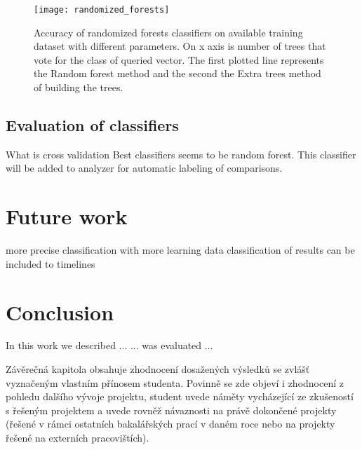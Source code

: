 \begin{figure}
  \centering
  \texttt{[image: randomized\_forests]}
  \caption{Accuracy of randomized forests classifiers on available training
    dataset with different parameters. On x axis is number of trees that vote
    for the class of queried vector. The first plotted line represents the
    Random forest method and the second the Extra trees method of building the
    trees.}
  \label{fig:randomized_forests}
\end{figure}

\section{Evaluation of classifiers}
What is cross validation
Best classifiers seems to be random forest.
This classifier will be added to analyzer for automatic labeling of comparisons.



\chapter{Future work}
more precise classification with more learning data
classification of results can be included to timelines



\chapter{Conclusion}
In this work we described ...
... was evaluated ...

Závěrečná kapitola obsahuje zhodnocení dosažených výsledků se zvlášť vyznačeným
vlastním přínosem studenta. Povinně se zde objeví i zhodnocení z pohledu dalšího
vývoje projektu, student uvede náměty vycházející ze zkušeností s řešeným
projektem a uvede rovněž návaznosti na právě dokončené projekty (řešené v rámci
ostatních bakalářských prací v daném roce nebo na projekty řešené na externích
pracovištích).


